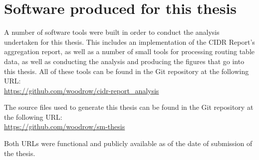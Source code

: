 \chapter{Software produced for this thesis}
\label{chap:opensource}

A number of software tools were built in order to conduct the analysis undertaken for this thesis. This includes an implementation of the CIDR Report's aggregation report, as well as a number of small tools for processing routing table data, as well as conducting the analysis and producing the figures that go into this thesis. All of these tools can be found in the Git repository at the following URL:\\
\indent \url{https://github.com/woodrow/cidr-report_analysis}

\vspace{1em}
\noindent The source files used to generate this thesis can be found in the Git repository at the following URL:\\
\indent \url{https://github.com/woodrow/sm-thesis}

\vspace{1em}
\noindent Both URLs were functional and publicly available as of the date of submission of the thesis.

